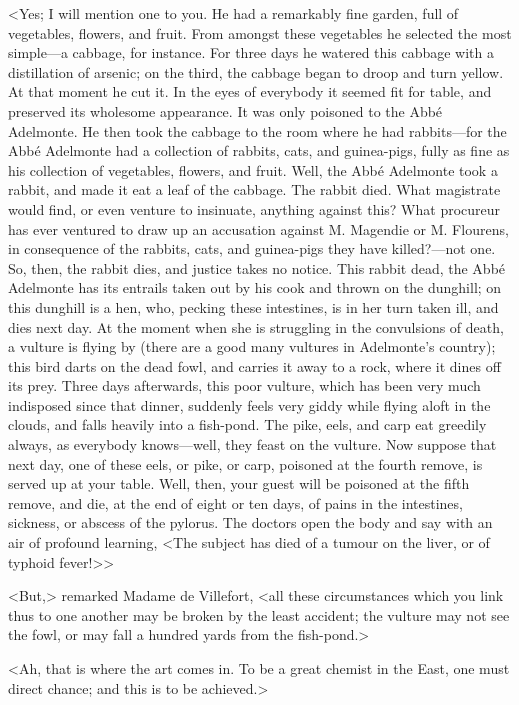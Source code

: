  <Yes; I will mention one to you. He had a remarkably fine garden, full of vegetables, flowers, and fruit. From amongst these vegetables he selected the most simple—a cabbage, for instance. For three days he watered this cabbage with a distillation of arsenic; on the third, the cabbage began to droop and turn yellow. At that moment he cut it. In the eyes of everybody it seemed fit for table, and preserved its wholesome appearance. It was only poisoned to the Abbé Adelmonte. He then took the cabbage to the room where he had rabbits—for the Abbé Adelmonte had a collection of rabbits, cats, and guinea-pigs, fully as fine as his collection of vegetables, flowers, and fruit. Well, the Abbé Adelmonte took a rabbit, and made it eat a leaf of the cabbage. The rabbit died. What magistrate would find, or even venture to insinuate, anything against this? What procureur has ever ventured to draw up an accusation against M. Magendie or M. Flourens, in consequence of the rabbits, cats, and guinea-pigs they have killed?—not one. So, then, the rabbit dies, and justice takes no notice. This rabbit dead, the Abbé Adelmonte has its entrails taken out by his cook and thrown on the dunghill; on this dunghill is a hen, who, pecking these intestines, is in her turn taken ill, and dies next day. At the moment when she is struggling in the convulsions of death, a vulture is flying by (there are a good many vultures in Adelmonte's country); this bird darts on the dead fowl, and carries it away to a rock, where it dines off its prey. Three days afterwards, this poor vulture, which has been very much indisposed since that dinner, suddenly feels very giddy while flying aloft in the clouds, and falls heavily into a fish-pond. The pike, eels, and carp eat greedily always, as everybody knows—well, they feast on the vulture. Now suppose that next day, one of these eels, or pike, or carp, poisoned at the fourth remove, is served up at your table. Well, then, your guest will be poisoned at the fifth remove, and die, at the end of eight or ten days, of pains in the intestines, sickness, or abscess of the pylorus. The doctors open the body and say with an air of profound learning, <The subject has died of a tumour on the liver, or of typhoid fever!>> 

 <But,> remarked Madame de Villefort, <all these circumstances which you link thus to one another may be broken by the least accident; the vulture may not see the fowl, or may fall a hundred yards from the fish-pond.> 

 <Ah, that is where the art comes in. To be a great chemist in the East, one must direct chance; and this is to be achieved.> 

